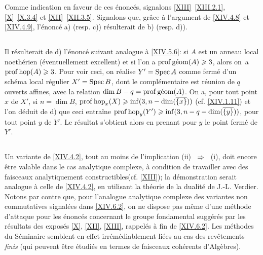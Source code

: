Comme indication en faveur de ces \'enonc\'es, signalons \ref{XIII}~\ref{XIII.2.1}, \ref{X}~\ref{X.3.4} et \ref{XII}~\ref{XII.3.5}. Signalons que, gr\^ace \`a l'argument de \ref{XIV.4.8} et \ref{XIV.4.9}, l'\'enonc\'e a) (resp. c)) r\'esulterait de b) (resp. d)).

\subsection{} \label{XIV.6.3}
Il r\'esulterait de d) l'\'enonc\'e suivant analogue \`a \ref{XIV.5.6}: si $A$ est un anneau local noeth\'erien (\'eventuellement excellent) et si l'on a $\operatorname{prof} \operatorname{g\acute{e}om} (A) \geqslant 3$, alors on~a $\operatorname{prof} \operatorname{hop} (A) \geqslant 3$. Pour voir ceci, on r\'ealise $Y'=\operatorname{Spec} A$ comme ferm\'e d'un sch\'ema local r\'egulier $X'=\operatorname{Spec} B$, dont le compl\'ementaire est r\'eunion de $q$ ouverts affines, avec la relation $\dim B -q=\operatorname{prof} \operatorname{g\acute{e}om}(A)$. On a, pour tout point $x$ de $X'$, si $n=\dim B$, $\operatorname{prof} \operatorname{hop}_x(X) \geqslant \inf(3, n-\dim(\overline{\{x\}}))$ (cf. \ref{XIV.1.11}) et l'on d\'eduit de d) que ceci entra\^ine $\operatorname{prof} \operatorname{hop}_y(Y') \geqslant \inf(3, n-q-\dim(\overline{\{y\}}))$, pour tout point $y$ de $Y'$. Le r\'esultat s'obtient alors en prenant pour $y$ le point ferm\'e de $Y'$.

\subsection{} \label{XIV.6.4}
Un variante de \ref{XIV.4.2}, tout au moins de l'implication \textup{(ii)} ~$\To$~ \textup{(i)}, doit encore \^etre valable dans le cas analytique complexe, \`a condition de travailler avec des faisceaux \og analytiquement constructibles\fg (cf. \ref{XIII}); la d\'emonstration serait analogue \`a celle de \ref{XIV.4.2}, en utilisant la th\'eorie de la dualit\'e de J.-L. Verdier. Notons par contre que, pour l'analogue analytique complexe des variantes non commutatives signal\'ees dans \ref{XIV.6.2}, on ne dispose pas m\^eme d'une m\'ethode d'attaque pour les \'enonc\'es concernant le groupe fondamental sugg\'er\'es par les r\'esultats des expos\'es \ref{X}, \ref{XII}, \ref{XIII}, rappel\'es \`a fin de \ref{XIV.6.2}. Les m\'ethodes du S\'eminaire semblent en effet irr\'em\'ediablement li\'ees au cas des rev\^etements \emph{finis} (qui peuvent \^etre \'etudi\'es en termes de faisceaux coh\'erents d'Alg\`ebres).

